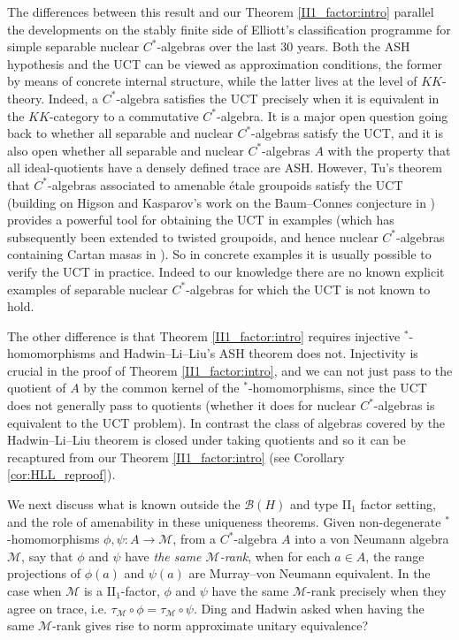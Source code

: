 \documentclass[reqno]{amsart}
\theoremstyle{definition}
\theoremstyle{remark}
\numberwithin{equation}{section}
\theoremstyle{definition}
\begin{document}
The differences between this result and our Theorem \ref{II1_factor:intro} parallel the developments on the stably finite side of Elliott's classification programme for simple separable nuclear $C^*$-algebras over the last 30 years. Both the ASH hypothesis and the UCT can be viewed as approximation conditions, the former by means of concrete internal structure, while the latter lives at the level of $KK$-theory. 
Indeed, a $C^*$-algebra satisfies the UCT precisely when it is equivalent in the $KK$-category to a commutative $C^*$-algebra.  It is a major open question going back to \cite{RS:UCT} whether all separable and nuclear $C^*$-algebras satisfy the UCT, and it is also open whether all separable and nuclear $C^*$-algebras $A$ with the property that all ideal-quotients have a densely defined trace are ASH.  However, Tu's theorem that $C^*$-algebras associated to amenable \'etale groupoids satisfy the UCT (building on Higson and Kasparov's work on the Baum--Connes conjecture in \cite{HK:Invent}) provides a powerful tool for obtaining the UCT in examples (which has subsequently been extended to twisted groupoids, and hence nuclear $C^*$-algebras containing Cartan masas in \cite{BarlakLi}).  So in concrete examples it is usually possible to verify the UCT in practice. Indeed to our knowledge there are no known explicit examples of separable nuclear $C^*$-algebras for which the UCT is not known to hold.

The other difference is that Theorem \ref{II1_factor:intro} requires injective $^*$-homomorphisms and Hadwin--Li--Liu's ASH theorem does not. Injectivity is crucial in the proof of Theorem \ref{II1_factor:intro}, and we can not just pass to the quotient of $A$ by the common kernel of the $^*$-homomorphisms, since the UCT does not generally pass to quotients (whether it does for nuclear $C^*$-algebras is equivalent to the UCT problem). In contrast the class of algebras covered by the Hadwin--Li--Liu theorem is closed under taking quotients and so it can be recaptured from our Theorem \ref{II1_factor:intro} (see Corollary \ref{cor:HLL_reproof}). 

We next discuss what is known outside the $\mathcal B(H)$ and type II$_1$ factor setting, and the role of amenability in these uniqueness theorems. Given non-degenerate $^*$-homomorphisms $\phi,\psi\colon A\to \mathcal M$, from a $C^*$-algebra $A$ into a von Neumann algebra $\mathcal M$, say that $\phi$ and $\psi$ have \emph{the same $\mathcal M$-rank}, when for each $a\in A$, the range projections of $\phi(a)$ and $\psi(a)$ are Murray--von Neumann equivalent. In the case when $\mathcal M$ is a II$_1$-factor, $\phi$ and $\psi$ have the same $\mathcal M$-rank precisely when they agree on trace, i.e. $\tau_{\mathcal M}\circ\phi=\tau_{\mathcal M}\circ\psi$. Ding and Hadwin asked when having the same $\mathcal M$-rank gives rise to norm approximate unitary equivalence? 
\end{document}
